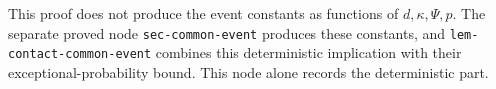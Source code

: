 This proof does not produce the event constants as functions of
$d,\kappa,\Psi,p$. The separate proved node \texttt{sec-common-event} produces these constants,
and \texttt{lem-contact-common-event} combines this deterministic implication
with their exceptional-probability bound. This node alone records the deterministic part.
